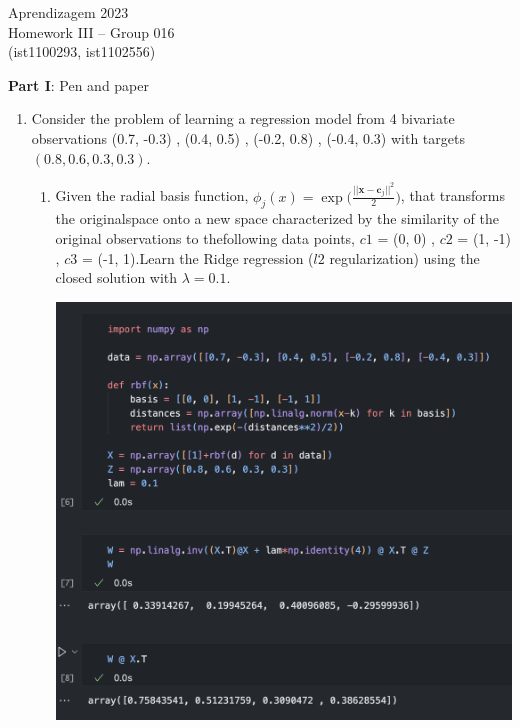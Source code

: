 \documentclass[12pt]{article}
\begin{document}
\newcommand{\prob}{\textrm{P}}
\newcommand{\ind}{\perp\!\!\!\!\!\perp} 
\newcommand{\notind}{\not\perp\!\!\!\!\!\perp}
\newcommand{\defeq}{\vcentcolon=}

\center
Aprendizagem 2023\\
Homework III -- Group 016\\
(ist1100293, ist1102556)\vskip 1cm

\large{\textbf{Part I}: Pen and paper}\normalsize

\begin{enumerate}[leftmargin=\labelsep]
    \item Consider the problem of learning a regression model from 4 bivariate observations {(0.7, -0.3) , (0.4, 0.5) , (-0.2, 0.8) , (-0.4, 0.3)} with targets $(0.8, 0.6, 0.3, 0.3)$.

    \begin{enumerate}
        \item Given the radial basis function, $\phi_j(x)=\exp\bigl( \frac{||\mathbf{x}-\mathbf{c}_j||^2}{2} \bigr)$, that transforms the originalspace onto a new space characterized by the similarity of the original observations to thefollowing data points, {$c1$ = (0, 0) , $c2$ = (1, -1) , $c3$ = (-1, 1)}.Learn the Ridge regression ($l2$ regularization) using the closed solution with $\lambda = 0.1$.
    
        \begin{center}
            \includegraphics[scale=0.5]{images/code1.png}
        \end{center}


\end{enumerate}
\end{enumerate}
\end{document}
